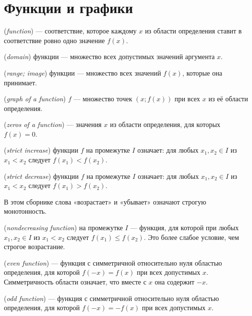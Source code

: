 \chapter{Функции и графики}\label{chap:c13}
\begin{definition} (\emph{function}) — соответствие, которое каждому \(x\) из области определения ставит в соответствие ровно одно значение \(f (x)\).\end{definition}
\begin{definition} (\emph{domain}) функции — множество всех допустимых значений аргумента \(x\).\end{definition}
\begin{definition} (\emph{range; image}) функции — множество всех значений \(f(x)\), которые она принимает.\end{definition}
\begin{definition} (\emph{graph of a function}) \(f\) — множество точек \((x;f(x))\) при всех \(x\) из её области определения.\end{definition}
\begin{definition} (\emph{zeros of a function}) — значения \(x\) из области определения, для которых \(f(x)=0\).\end{definition}
\begin{definition} (\emph{strict increase}) функции \(f\) на промежутке \(I\) означает: для любых \(x_1,x_2\in I\) из \(x_1<x_2\) следует \(f(x_1)<f(x_2)\).\end{definition}
\begin{definition} (\emph{strict decrease}) функции \(f\) на промежутке \(I\) означает: для любых \(x_1,x_2\in I\) из \(x_1<x_2\) следует \(f(x_1)>f(x_2)\).\end{definition}
В этом сборнике слова «возрастает» и «убывает» означают строгую монотонность.
\begin{definition} (\emph{nondecreasing function}) на промежутке \(I\) — функция, для которой при любых \(x_1,x_2\in I\) из \(x_1<x_2\) следует \(f(x_1)\le f(x_2)\). Это более слабое условие, чем строгое возрастание.\end{definition}
\begin{definition} (\emph{even function}) — функция с симметричной относительно нуля областью определения, для которой \(f(-x)=f(x)\) при всех допустимых \(x\). Симметричность области означает, что вместе с \(x\) она содержит \(-x\).\end{definition}
\begin{definition} (\emph{odd function}) — функция с симметричной относительно нуля областью определения, для которой \(f(-x)=-f(x)\) при всех допустимых \(x\).\end{definition}
